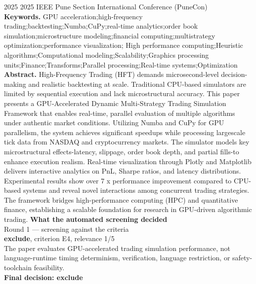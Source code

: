 \documentclass[11pt,a4paper]{article}
\begin{document}
{\color{soft}\small 2025 \textperiodcentered{} 2025 IEEE Pune Section International Conference (PuneCon)}\\[2mm]
{\small\textbf{Keywords.} GPU acceleration;high-frequency trading;backtesting;Numba;CuPy;real-time analytics;order book simulation;microstructure modeling;financial computing;multistrategy optimization;performance visualization; High performance computing;Heuristic algorithms;Computational modeling;Scalability;Graphics processing units;Finance;Transforms;Parallel processing;Real-time systems;Optimization}\\[2mm]
{\small\textbf{Abstract.} High-Frequency Trading (HFT) demands microsecond-level decision-making and realistic backtesting at scale. Traditional CPU-based simulators are limited by sequential execution and lack microstructural accuracy. This paper presents a GPU-Accelerated Dynamic Multi-Strategy Trading Simulation Framework that enables real-time, parallel evaluation of multiple algorithms under authentic market conditions. Utilizing Numba and CuPy for GPU parallelism, the system achieves significant speedups while processing largescale tick data from NASDAQ and cryptocurrency markets. The simulator models key microstructural effects-latency, slippage, order book depth, and partial fills-to enhance execution realism. Real-time visualization through Plotly and Matplotlib delivers interactive analytics on PnL, Sharpe ratios, and latency distributions. Experimental results show over 7 x performance improvement compared to CPU-based systems and reveal novel interactions among concurrent trading strategies. The framework bridges high-performance computing (HPC) and quantitative finance, establishing a scalable foundation for research in GPU-driven algorithmic trading.}
\vspace{3mm}
\vspace{2.5mm}
{\small\textbf{What the automated screening decided}}\\[2mm]
{\footnotesize\color{soft}Round 1 --- screening against the criteria}\\[0.5mm]
{\small\textbf{exclude}, criterion E4, relevance 1/5}\\[0.5mm]
{\small The paper evaluates GPU-accelerated trading simulation performance, not language-runtime timing determinism, verification, language restriction, or safety-toolchain feasibility.}\\[2.5mm]
{\small\textbf{Final decision: exclude}}
\end{document}
